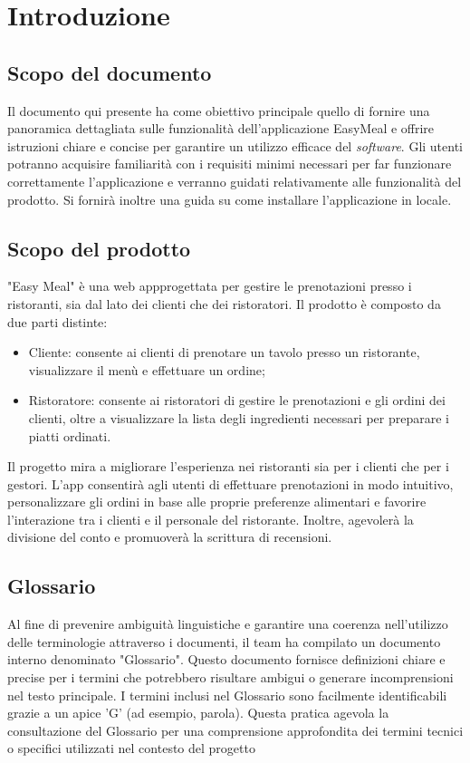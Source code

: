 \section{Introduzione}
\subsection{Scopo del documento}
Il documento qui presente ha come obiettivo principale quello di fornire una panoramica dettagliata sulle funzionalità dell'applicazione EasyMeal e offrire 
istruzioni chiare e concise per garantire un utilizzo efficace del \textit{software}. Gli utenti potranno acquisire familiarità 
con i requisiti minimi necessari per far funzionare correttamente l'applicazione e verranno guidati relativamente alle funzionalità del prodotto.
Si fornirà inoltre una guida su come installare l'applicazione in locale.

\subsection{Scopo del prodotto}
"Easy Meal" è una web app\g progettata per gestire le prenotazioni presso i ristoranti, sia
dal lato dei clienti che dei ristoratori. Il prodotto è composto da due parti distinte:
\begin{itemize}
	\item Cliente\g: consente ai clienti di prenotare un tavolo presso un ristorante, visualizzare
	il menù e effettuare un ordine\g ;
	\item Ristoratore: consente ai ristoratori di gestire le prenotazioni e gli ordini dei clienti,
	oltre a visualizzare la lista degli ingredienti necessari per preparare i piatti ordinati.
\end{itemize}
Il progetto mira a migliorare l'esperienza nei ristoranti sia per i clienti che per i gestori.
L'app consentirà agli utenti di effettuare prenotazioni in modo intuitivo, personalizzare gli ordini in base alle proprie preferenze
alimentari e favorire l'interazione tra i clienti e il personale del ristorante.
Inoltre, agevolerà la divisione del conto e promuoverà la scrittura di recensioni.

\subsection{Glossario}
Al fine di prevenire ambiguità linguistiche e garantire una coerenza nell'utilizzo delle terminologie attraverso i documenti, il team ha compilato un documento interno 
denominato "Glossario". Questo documento fornisce definizioni chiare e precise per i termini che potrebbero risultare ambigui o generare incomprensioni nel testo 
principale. I termini inclusi nel Glossario sono facilmente identificabili grazie a un apice 'G' (ad esempio, parola\g ).
Questa pratica agevola la consultazione del Glossario per una comprensione approfondita dei termini tecnici o specifici utilizzati nel contesto del progetto

